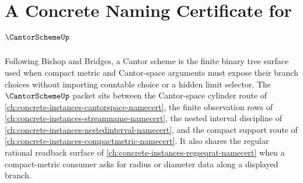 \chapter{A Concrete Naming Certificate for $\CantorSchemeUp$}
\label{ch:concrete-instances-cantor-scheme-namecert}

Following Bishop and Bridges, a Cantor scheme is the finite binary tree surface used when compact metric and Cantor-space arguments must expose their branch choices without importing countable choice or a hidden limit selector. The $\CantorSchemeUp$ packet sits between the Cantor-space cylinder route of \autoref{ch:concrete-instances-cantorspace-namecert}, the finite observation rows of \autoref{ch:concrete-instances-streamname-namecert}, the nested interval discipline of \autoref{ch:concrete-instances-nestedinterval-namecert}, and the compact support route of \autoref{ch:concrete-instances-compactmetric-namecert}. It also shares the regular rational readback surface of \autoref{ch:concrete-instances-regseqrat-namecert} when a compact-metric consumer asks for radius or diameter data along a displayed branch.

